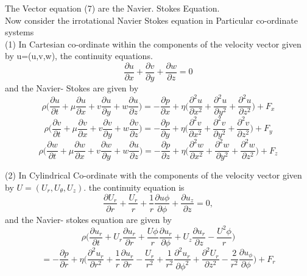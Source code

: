 \documentclass[a4paper, 12pt]{report}
\begin{document}
The Vector equation (7) are the Navier. Stokes Equation.\\
Now consider the irrotational Navier Stokes equation in Particular co-ordinate systems\\

(1) \quad In Cartesian co-ordinate within the components of the velocity vector given by u=(u,v,w), the continuity equations.
\begin{equation*}
	\frac{\partial u}{\partial x}+\frac{\partial v}{\partial y}+\frac{\partial w}{\partial z}=0
\end{equation*}
and the Navier- Stokes are given by
\begin{equation*} 
	\rho\bigg(\frac{\partial u}{\partial t}+\mu\frac{\partial u}{\partial x}+v\frac{\partial u}{\partial y}+w\frac{\partial u}{\partial z}\bigg)=-\frac{\partial p}{\partial x}+\eta\bigg(\frac{\partial^2 u}{\partial x^2}+\frac{\partial^2 u}{\partial y^2}+\frac{\partial^2 u}{\partial z^2}\bigg)+F_x
\end{equation*}
\begin{equation*} 
	\rho\bigg(\frac{\partial v}{\partial t}+\mu\frac{\partial v}{\partial x}+v\frac{\partial v}{\partial y}+w\frac{\partial v}{\partial z}\bigg)=-\frac{\partial p}{\partial y}+\eta\bigg(\frac{\partial^2 v}{\partial x^2}+\frac{\partial^2 v}{\partial y^2}+\frac{\partial^2 v}{\partial z^2}\bigg)+F_y
\end{equation*}
\begin{equation*} 
	\rho\bigg(\frac{\partial w}{\partial t}+\mu\frac{\partial w}{\partial x}+v\frac{\partial w}{\partial y}+w\frac{\partial u}{\partial z}\bigg)=-\frac{\partial p}{\partial z}+\eta\bigg(\frac{\partial^2 w}{\partial x^2}+\frac{\partial^2 w}{\partial y^2}+\frac{\partial^2 w}{\partial z^2}\bigg)+F_z
\end{equation*}

(2) In Cylindrical Co-ordinate with the components of the velocity vector given by $U=(U_r,U_\theta,U_z)$. the continuity equation is 
\begin{equation*}
	\frac{\partial U_r}{\partial r}+\frac{U_r}{r}+\frac{1}{r}\frac{\partial u\phi}{\partial \phi}+\frac{\partial u_z}{\partial z}=0,
\end{equation*}
and the Navier- stokes equation are given by
\begin{equation*} 
	\rho\bigg(\frac{\partial u_r}{\partial t}+U_r\frac{\partial u_r}{\partial r}+\frac{U\phi}{r}\frac{\partial u_r}{\partial \phi}+U_z\frac{\partial u_r}{\partial z}-\frac{U^2\phi}{r}\bigg)
\end{equation*}
\begin{equation*} 
	=-\frac{\partial p}{\partial r}+\eta\bigg(\frac{\partial^2 u_r}{\partial r^2}+\frac{1}{r}\frac{\partial u_r}{\partial r}-\frac{U_r}{r^2}+\frac{1}{r^2}\frac{\partial^2 u_r}{\partial \phi^2}+\frac{\partial^2 U_r}{\partial z^2}-\frac{2}{r^2}\frac{\partial u_\phi}{\partial \phi}\bigg)+F_r
\end{equation*}
\end{document}
